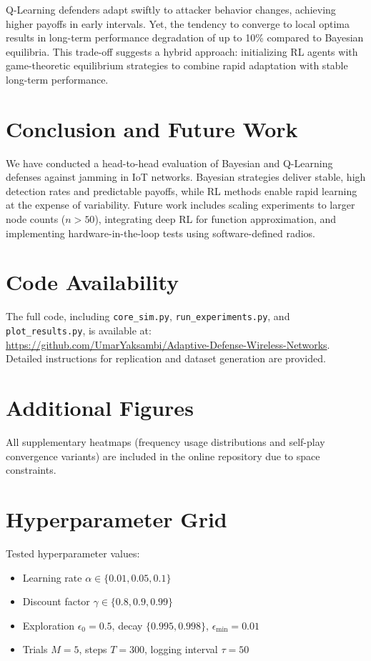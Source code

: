 \documentclass[conference]{IEEEtran}
\begin{document}
Q-Learning defenders adapt swiftly to attacker behavior changes, achieving higher payoffs in early intervals. Yet, the tendency to converge to local optima results in long-term performance degradation of up to 10\% compared to Bayesian equilibria. This trade-off suggests a hybrid approach: initializing RL agents with game-theoretic equilibrium strategies to combine rapid adaptation with stable long-term performance.

\section{Conclusion and Future Work}
We have conducted a head-to-head evaluation of Bayesian and Q-Learning defenses against jamming in IoT networks. Bayesian strategies deliver stable, high detection rates and predictable payoffs, while RL methods enable rapid learning at the expense of variability. Future work includes scaling experiments to larger node counts ($n>50$), integrating deep RL for function approximation, and implementing hardware-in-the-loop tests using software-defined radios.

\section*{Code Availability}
The full code, including \texttt{core\_sim.py}, \texttt{run\_experiments.py}, and \texttt{plot\_results.py}, is available at:\\
\url{https://github.com/UmarYaksambi/Adaptive-Defense-Wireless-Networks}. Detailed instructions for replication and dataset generation are provided.

\appendix
\section{Additional Figures}
All supplementary heatmaps (frequency usage distributions and self-play convergence variants) are included in the online repository due to space constraints.

\section{Hyperparameter Grid}
Tested hyperparameter values:
\begin{itemize}
  \item Learning rate $\alpha \in \{0.01,0.05,0.1\}$
  \item Discount factor $\gamma \in \{0.8,0.9,0.99\}$
  \item Exploration $\epsilon_{0}=0.5$, decay $\{0.995,0.998\}$, $\epsilon_{\min}=0.01$
  \item Trials $M=5$, steps $T=300$, logging interval $\tau=50$
\end{itemize}
\end{document}
